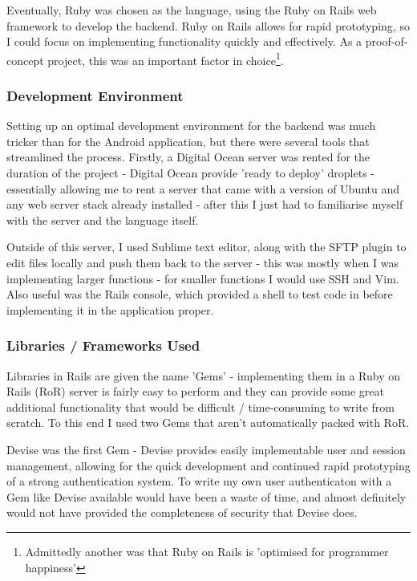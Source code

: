 \documentclass[11pt]{informatics-report}
\begin{document}
Eventually, Ruby was chosen as the language, using the Ruby on Rails web framework to develop the backend. Ruby on Rails allows for rapid prototyping, so I could focus on implementing functionality quickly and effectively. As a proof-of-concept project, this was an important factor in choice\footnote{Admittedly another was that Ruby on Rails is 'optimised for programmer happiness'}.

\subsubsection{Development Environment}

Setting up an optimal development environment for the backend was much tricker than for the Android application, but there were several tools that streamlined the process. Firstly, a Digital Ocean server was rented for the duration of the project - Digital Ocean provide 'ready to deploy' droplets - essentially allowing me to rent a server that came with a version of Ubuntu and any web server stack already installed - after this I just had to familiarise myself with the server and the language itself.

Outside of this server, I used Sublime text editor, along with the SFTP plugin to edit files locally and push them back to the server - this was mostly when I was implementing larger functions - for smaller functions I would use SSH and Vim. Also useful was the Rails console, which provided a shell to test code in before implementing it in the application proper.

\subsubsection{Libraries / Frameworks Used}

Libraries in Rails are given the name 'Gems' - implementing them in a Ruby on Rails (RoR) server is fairly easy to perform and they can provide some great additional functionality that would be difficult / time-consuming to write from scratch. To this end I used two Gems that aren't automatically packed with RoR.

Devise was the first Gem - Devise provides easily implementable user and session management, allowing for the quick development and continued rapid prototyping of a strong authentication system. To write my own user authenticaton with a Gem like Devise available would have been a waste of time, and almost definitely would not have provided the completeness of security that Devise does. 
\end{document}
